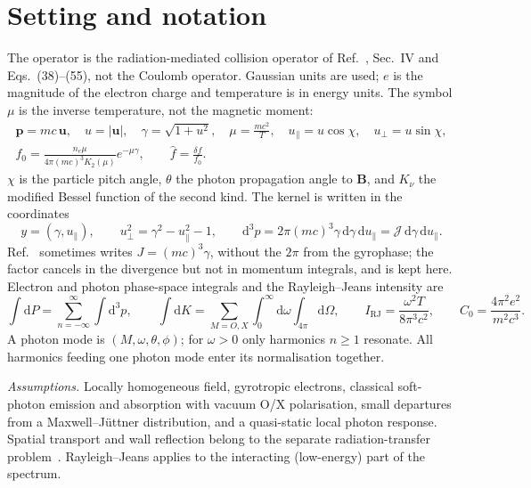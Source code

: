 \documentclass[11pt,a4paper]{article}
\numberwithin{equation}{section}
\newcommand{\dd}{\mathrm{d}}
\newcommand{\upar}{u_\parallel}
\newcommand{\uperp}{u_\perp}
\newcommand{\fh}{\hat f}
\begin{document}
\section{Setting and notation}

The operator is the radiation-mediated collision operator of
Ref.~\cite{KK96}, Sec.~IV and Eqs.~(38)--(55), not the Coulomb operator.
Gaussian units are used; $e$ is the magnitude of the electron charge and
temperature is in energy units. The symbol $\mu$ is the inverse
temperature, not the magnetic moment:
\begin{gather}
\mathbf p=mc\,\mathbf u,\quad u=|\mathbf u|,\quad \gamma=\sqrt{1+u^2},\quad
\mu=\frac{mc^2}{T},\quad
\upar=u\cos\chi,\quad \uperp=u\sin\chi,\\
f_0=\frac{n_e\mu}{4\pi(mc)^3K_2(\mu)}e^{-\mu\gamma},\qquad \fh=\frac{\delta f}{f_0}.
\end{gather}
$\chi$ is the particle pitch angle, $\theta$ the photon propagation angle to
$\mathbf B$, and $K_\nu$ the modified Bessel function of the second kind. The
kernel is written in the coordinates
\begin{equation}
y=(\gamma,\upar),\qquad \uperp^2=\gamma^2-\upar^2-1,\qquad
\dd^3p=2\pi(mc)^3\gamma\,\dd\gamma\,\dd\upar=\mathcal J\,\dd\gamma\,\dd\upar .
\end{equation}
Ref.~\cite{KK96} sometimes writes $J=(mc)^3\gamma$, without the $2\pi$ from
the gyrophase; the factor cancels in the divergence but not in momentum
integrals, and is kept here. Electron and photon phase-space integrals and the
Rayleigh--Jeans intensity are
\begin{equation}
\int\dd P=\sum_{n=-\infty}^{\infty}\int\dd^3p,\qquad
\int\dd K=\sum_{M=O,X}\int_0^\infty\dd\omega\int_{4\pi}\dd\Omega,\qquad
I_{\mathrm{RJ}}=\frac{\omega^2T}{8\pi^3c^2},\qquad C_0=\frac{4\pi^2e^2}{m^2c^3}.
\end{equation}
A photon mode is $(M,\omega,\theta,\phi)$; for $\omega>0$ only harmonics
$n\ge1$ resonate. All harmonics feeding one photon mode enter its
normalisation together.

\emph{Assumptions.} Locally homogeneous field, gyrotropic electrons, classical
soft-photon emission and absorption with vacuum O/X polarisation, small
departures from a Maxwell--J\"uttner distribution, and a quasi-static local
photon response. Spatial transport and wall reflection belong to the separate
radiation-transfer problem~\cite{KK96b}. Rayleigh--Jeans applies to the
interacting (low-energy) part of the spectrum.
\end{document}

